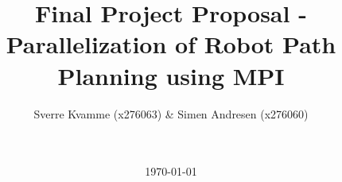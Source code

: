 



\title{Final Project Proposal - Parallelization of Robot Path Planning using MPI}
\author{Sverre Kvamme (x276063) \& Simen Andresen (x276060)}
\date{\ \\ \ \\ \today}




\maketitle


\pagestyle{fancy}
\lhead{}
\rhead{\thepage}
\setcounter{page}{1}

\rhead{\thepage}
\cfoot{}


%



